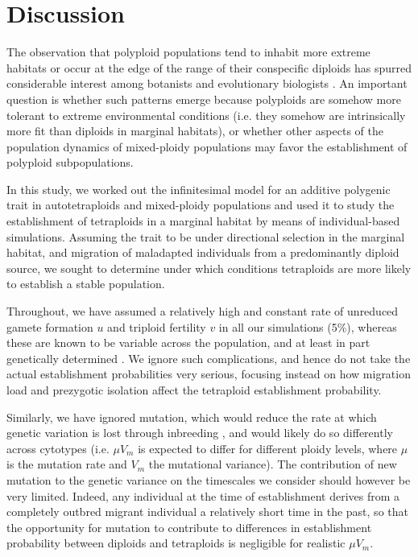 \documentclass[12pt,a4paper]{article}
\begin{document}
\section*{Discussion}

The observation that polyploid populations tend to inhabit more extreme
habitats or occur at the edge of the range of their conspecific diploids
has spurred considerable interest among botanists and evolutionary biologists
\citep{kolar2017,rice2019,vandepeer2021,griswold2021,mortier2024}.
An important question is whether such patterns emerge because polyploids are
somehow more tolerant to extreme environmental conditions (i.e. they somehow
are intrinsically more fit than diploids in marginal habitats), or whether other
aspects of the population dynamics of mixed-ploidy populations may favor the
establishment of polyploid subpopulations.

In this study, we worked out the infinitesimal model for an additive polygenic
trait in autotetraploids and mixed-ploidy populations and used it to study the
establishment of tetraploids in a marginal habitat by means of individual-based
simulations.
Assuming the trait to be under directional selection in the marginal habitat,
and migration of maladapted individuals from a predominantly diploid source,
we sought to determine under which conditions tetraploids are more likely to
establish a stable population.

Throughout, we have assumed a relatively high and constant rate of unreduced
gamete formation $u$ and triploid fertility $v$ in all our simulations (5\%),
whereas these are known to be variable across the population, and at least in
part genetically determined \citep{kreiner2017,clo2022c}.
We ignore such complications, and hence do not take the actual establishment
probabilities very serious, focusing instead on how migration load and
prezygotic isolation affect the tetraploid establishment probability.

Similarly, we have ignored mutation, which would reduce the rate at which
genetic variation is lost through inbreeding \citep{barton2017}, and would
likely do so differently across cytotypes (i.e. $\mu V_m$ is expected to differ
for different ploidy levels, where $\mu$ is the mutation rate and $V_m$ the
mutational variance).
The contribution of new mutation to the genetic variance on the timescales we
consider should however be very limited.
Indeed, any individual at the time of establishment derives from a completely
outbred migrant individual a relatively short time in the past, so that the
opportunity for mutation to contribute to differences in establishment
probability between diploids and tetraploids is negligible for realistic
$\mu V_m$.
\end{document}
